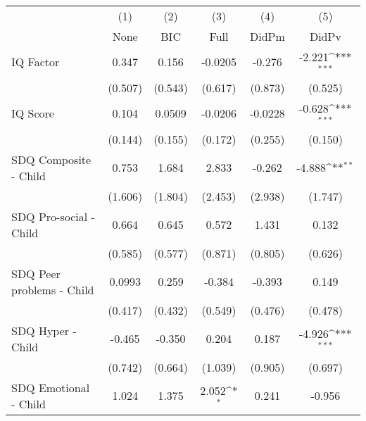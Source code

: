 {
\def\sym#1{\ifmmode^{#1}\else\(^{#1}\)\fi}
\begin{tabular}{l*{5}{c}}
\toprule
            &\multicolumn{1}{c}{(1)}&\multicolumn{1}{c}{(2)}&\multicolumn{1}{c}{(3)}&\multicolumn{1}{c}{(4)}&\multicolumn{1}{c}{(5)}\\
            &\multicolumn{1}{c}{None}&\multicolumn{1}{c}{BIC}&\multicolumn{1}{c}{Full}&\multicolumn{1}{c}{DidPm}&\multicolumn{1}{c}{DidPv}\\
\midrule
IQ Factor   &       0.347         &       0.156         &     -0.0205         &      -0.276         &      -2.221\sym{***}\\
            &     (0.507)         &     (0.543)         &     (0.617)         &     (0.873)         &     (0.525)         \\
\addlinespace
IQ Score    &       0.104         &      0.0509         &     -0.0206         &     -0.0228         &      -0.628\sym{***}\\
            &     (0.144)         &     (0.155)         &     (0.172)         &     (0.255)         &     (0.150)         \\
\addlinespace
SDQ Composite - Child&       0.753         &       1.684         &       2.833         &      -0.262         &      -4.888\sym{**} \\
            &     (1.606)         &     (1.804)         &     (2.453)         &     (2.938)         &     (1.747)         \\
\addlinespace
SDQ Pro-social - Child&       0.664         &       0.645         &       0.572         &       1.431         &       0.132         \\
            &     (0.585)         &     (0.577)         &     (0.871)         &     (0.805)         &     (0.626)         \\
\addlinespace
SDQ Peer problems - Child&      0.0993         &       0.259         &      -0.384         &      -0.393         &       0.149         \\
            &     (0.417)         &     (0.432)         &     (0.549)         &     (0.476)         &     (0.478)         \\
\addlinespace
SDQ Hyper - Child&      -0.465         &      -0.350         &       0.204         &       0.187         &      -4.926\sym{***}\\
            &     (0.742)         &     (0.664)         &     (1.039)         &     (0.905)         &     (0.697)         \\
\addlinespace
SDQ Emotional - Child&       1.024         &       1.375         &       2.052\sym{*}  &       0.241         &      -0.956         \\

\end{tabular}}
